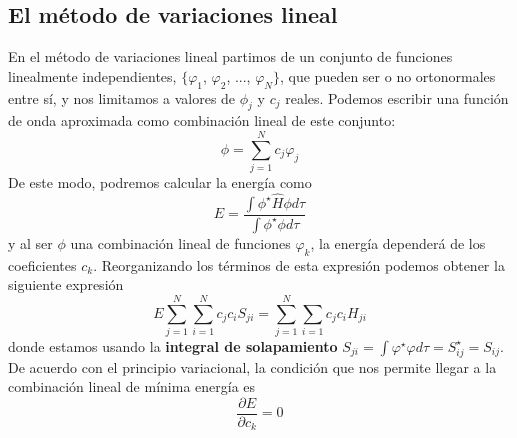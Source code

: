 \subsection{El método de variaciones lineal}
En el método de variaciones lineal partimos de un conjunto de
funciones linealmente independientes, 
 $\{\varphi_1$, $\varphi_2$, ..., $\varphi_N\}$, 
 que pueden ser o no ortonormales entre sí,  y nos limitamos a
 valores de $\phi_j$ y $c_j$ reales. 
 Podemos escribir una función de onda aproximada como
combinación lineal de este conjunto:
\begin{equation}
    \phi=\sum_{j=1}^{N}c_j\varphi_j
\end{equation}
De este modo, podremos calcular la energía como 
\begin{equation}
    E=\frac{\int\phi^\star\hat{H}\phi d\tau}{\int\phi^\star\phi d\tau}
\end{equation}
y al ser $\phi$ una combinación lineal de funciones $\varphi_k$,
la energía dependerá de los coeficientes $c_k$.
Reorganizando los términos de esta expresión podemos obtener 
la siguiente expresión
\begin{equation}
    E\sum_{j=1}^N\sum_{i=1}^N c_j c_iS_{ji}=\sum_{j=1}^N\sum_{i=1}c_jc_iH_{ji}
\end{equation}
donde estamos usando la \textbf{integral de solapamiento}
$S_{ji}=\int \varphi^\star\varphi d\tau=S^\star_{ij}=S_{ij}$.
De acuerdo con el principio variacional, la condición que nos 
permite llegar a la combinación lineal de mínima energía es
\begin{equation}
    \frac{\partial E}{\partial c_k}=0
    \label{eq:var_deriv}
\end{equation}

